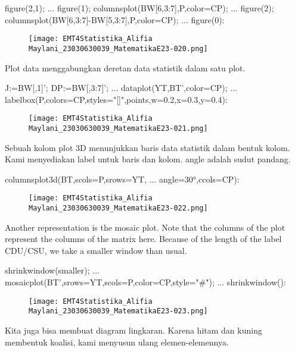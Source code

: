 \documentclass{article}
\begin{document}
\>figure(2,1);  ...  
\>   figure(1); columnsplot(BW[6,3:7],P,color=CP); ...  
\>   figure(2); columnsplot(BW[6,3:7]-BW[5,3:7],P,color=CP);  ...  
\>   figure(0):


\begin{figure}
    \centering
    \texttt{[image: EMT4Statistika\_Alifia Maylani\_23030630039\_MatematikaE23-020.png]}
    \caption{}
    \label{fig:enter-label}
\end{figure}

Plot data menggabungkan deretan data statistik dalam satu plot.


\> 

\>J:=BW[,1]'; DP:=BW[,3:7]'; ...  
\>   dataplot(YT,BT',color=CP);  ...  
\>   labelbox(P,colors=CP,styles="[]",\>points,w=0.2,x=0.3,y=0.4):


\begin{figure}
    \centering
    \texttt{[image: EMT4Statistika\_Alifia Maylani\_23030630039\_MatematikaE23-021.png]}
    \caption{}
    \label{fig:enter-label}
\end{figure}

Sebuah kolom plot 3D menunjukkan baris data statistik dalam bentuk
kolom. Kami menyediakan label untuk baris dan kolom. angle adalah
sudut pandang.


\>columnsplot3d(BT,scols=P,srows=YT, ...  
\>     angle=30°,ccols=CP):


\begin{figure}
    \centering
    \texttt{[image: EMT4Statistika\_Alifia Maylani\_23030630039\_MatematikaE23-022.png]}
    \caption{}
    \label{fig:enter-label}
\end{figure}

Another representation is the mosaic plot. Note that the columns of the plot represent the
columns of the matrix here. Because of the length of the label CDU/CSU, we take a smaller
window than usual.


\>shrinkwindow(\>smaller);  ...  
\>   mosaicplot(BT',srows=YT,scols=P,color=CP,style="#"); ...  
\>   shrinkwindow():


\begin{figure}
    \centering
    \texttt{[image: EMT4Statistika\_Alifia Maylani\_23030630039\_MatematikaE23-023.png]}
    \caption{}
    \label{fig:enter-label}
\end{figure}

Kita juga bisa membuat diagram lingkaran. Karena hitam dan kuning
membentuk koalisi, kami menyusun ulang elemen-elemennya.
\end{document}
